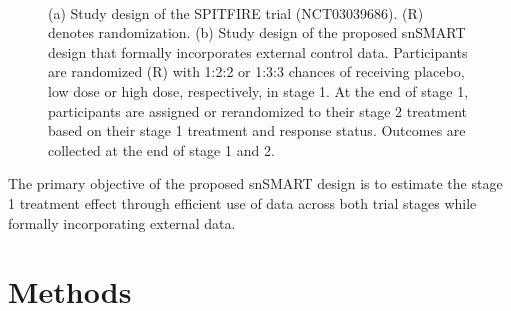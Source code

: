 \begin{figure}
\centering
{}
\\
\caption{(a) Study design of the SPITFIRE trial (NCT03039686). (R) denotes randomization. (b) Study design of the proposed \ac{snSMART} design that formally incorporates external control data. Participants are randomized (R) with 1:2:2 or 1:3:3 chances of receiving placebo, low dose or high dose, respectively, in stage 1. At the end of stage 1, participants are assigned or rerandomized to their stage 2 treatment based on their stage 1 treatment and response status. Outcomes are collected at the end of stage 1 and 2.}
\label{fig:codatasnSMART}
\end{figure}

The primary objective of the proposed \ac{snSMART} design is to estimate the stage 1 treatment effect through efficient use of data across both trial stages while formally incorporating external data. 

\section{Methods} \label{s:methods}
 
